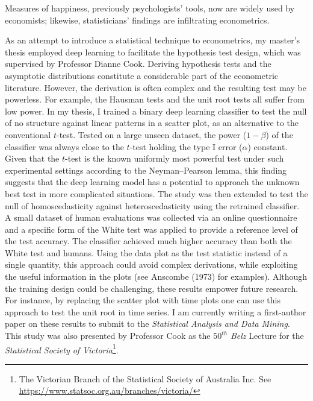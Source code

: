 \documentclass[12pt,]{article}
\let\rmarkdownfootnote\footnote%
\def\footnote{\protect\rmarkdownfootnote}
\begin{document}
Measures of happiness, previously psychologists' tools, now are widely
used by economists; likewise, statisticians' findings are infiltrating
econometrics.

As an attempt to introduce a statistical technique to econometrics, my
master's thesis employed deep learning to facilitate the hypothesis test
design, which was supervised by Professor Dianne Cook. Deriving
hypothesis tests and the asymptotic distributions constitute a
considerable part of the econometric literature. However, the derivation
is often complex and the resulting test may be powerless. For example,
the Hausman tests and the unit root tests all suffer from low power. In
my thesis, I trained a binary deep learning classifier to test the null
of no structure against linear patterns in a scatter plot, as an
alternative to the conventional \(t\)-test. Tested on a large unseen
dataset, the power (\(1-\beta\)) of the classifier was always close to
the \(t\)-test holding the type I error (\(\alpha\)) constant. Given
that the \(t\)-test is the known uniformly most powerful test under such
experimental settings according to the Neyman--Pearson lemma, this
finding suggests that the deep learning model has a potential to
approach the unknown best test in more complicated situations. The study
was then extended to test the null of homoscedasticity against
heteroscedasticity using the retrained classifier. A small dataset of
human evaluations was collected via an online questionnaire and a
specific form of the White test was applied to provide a reference level
of the test accuracy. The classifier achieved much higher accuracy than
both the White test and humans. Using the data plot as the test
statistic instead of a single quantity, this approach could avoid
complex derivations, while exploiting the useful information in the
plots (see Anscombe (1973) for examples). Although the training design
could be challenging, these results empower future research. For
instance, by replacing the scatter plot with time plots one can use this
approach to test the unit root in time series. I am currently writing a
first-author paper on these results to submit to the \emph{Statistical
Analysis and Data Mining}. This study was also presented by Professor
Cook as the \(50^{th}\) \emph{Belz} Lecture for the \emph{Statistical
Society of Victoria}\footnote{The Victorian Branch of the Statistical
  Society of Australia Inc. See
  \url{https://www.statsoc.org.au/branches/victoria/}}.
\end{document}
